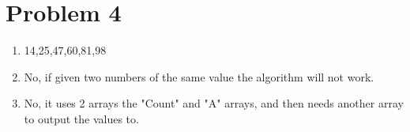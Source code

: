 \documentclass[12pt,letterpaper]{article}
\begin{document}
\section*{Problem 4}
\begin{enumerate}
    \item 14,25,47,60,81,98
    \item No, if given two numbers of the same value the algorithm will not work.
    \item No, it uses 2 arrays the "Count" and "A" arrays, and then needs another array to output the values to.
\end{enumerate}
\end{document}
